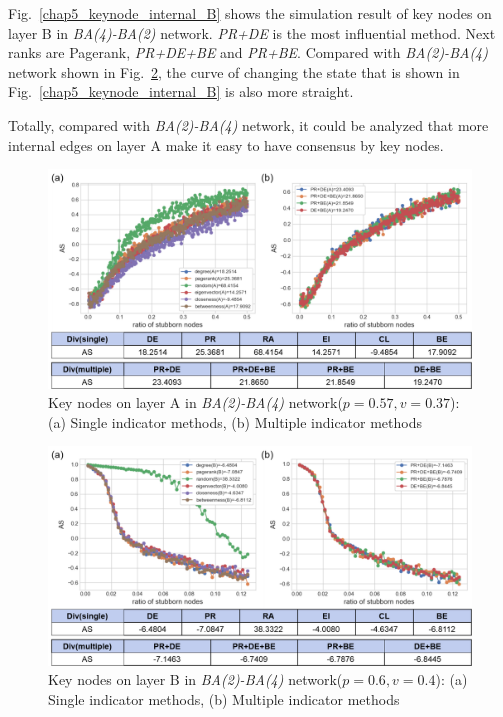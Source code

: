 Fig.~\ref{chap5_keynode_internal_B} shows the simulation result of key nodes on layer B in \textit{BA(4)-BA(2)} network. \textit{PR+DE} is the most influential method. Next ranks are Pagerank, \textit{PR+DE+BE} and \textit{PR+BE}. Compared with \textit{BA(2)-BA(4)} network shown in Fig.~\ref{chap5_keynode_internal_B2}, the curve of changing the state that is shown in Fig.~\ref{chap5_keynode_internal_B} is also more straight. 

Totally, compared with \textit{BA(2)-BA(4)} network, it could be analyzed that more internal edges on layer A make it easy to have consensus by key nodes. 

\begin{figure}[!htb]
	\centering
	\includegraphics[width=\hsize]{figure/chap5_keynode_internal_A2.png}
	\caption{Key nodes on layer A in \textit{BA(2)-BA(4)} network($p=0.57, v=0.37$):
		(a) Single indicator methods, (b) Multiple indicator methods}
	\label{chap5_keynode_internal_A2}
\end{figure}
\begin{figure}[!htb]
	\centering
	\includegraphics[width=\hsize]{figure/chap5_keynode_internal_B2.png}
	\caption{Key nodes on layer B in \textit{BA(2)-BA(4)} network($p=0.6, v=0.4$):
		(a) Single indicator methods, (b) Multiple indicator methods}
	\label{chap5_keynode_internal_B2}
\end{figure}

